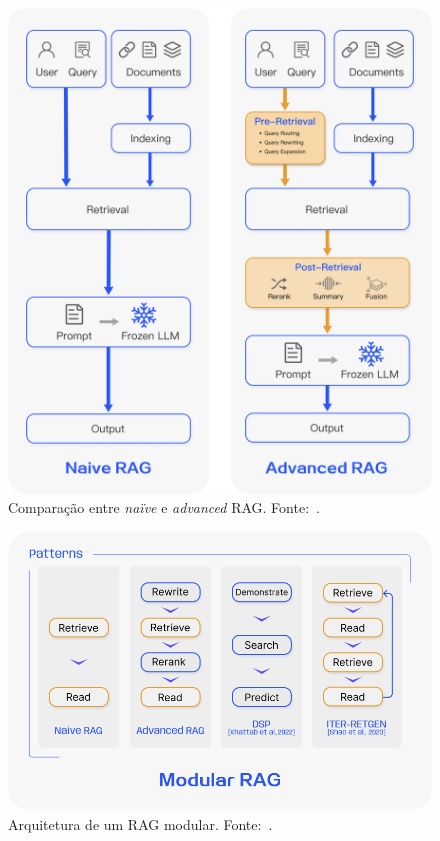\documentclass[journal]{IEEEtran}
\begin{document}
\begin{figure}[h]
    \centering
    \includegraphics[width=\columnwidth]{media/RAG_naive_advanced.png}
    \caption{%
    Comparação entre \textit{naïve} e \textit{advanced} RAG\@.
    Fonte:~\cite{gao2023retrieval}.\label{fig:rag_naive_advanced}}
\end{figure}

\begin{figure}[h]
    \centering
    \includegraphics[width=0.9\columnwidth]{media/RAG_modular.png}
    \caption{%
    Arquitetura de um RAG modular.
    Fonte:~\cite{gao2023retrieval}.\label{fig:rag_modular}}
\end{figure}
\end{document}
